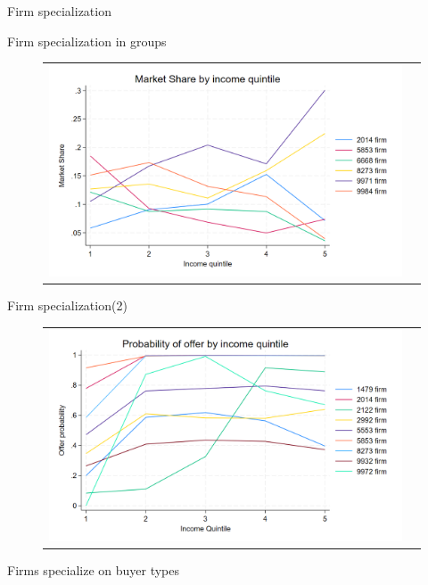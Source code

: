 \documentclass[10pt,aspectratio=169]{beamer}
\begin{document}


\begin{frame}{Firm specialization}\label{slide:fig1}    

Firm specialization in groups
\begin{figure}[H]
\centering{}%
\begin{tabular}{cc}
\includegraphics[scale=0.27]{../figures/IE3_supply_income_quintile.png}
\end{tabular}
\end{figure}

\hyperlink{slide:answer1}{}

\end{frame}


\begin{frame}{Firm specialization(2)}\label{slide:fig2}    

\begin{figure}[H]
\caption{}
\centering{}%
\begin{tabular}{cc}
\includegraphics[scale=0.24]{../figures/IE3_supply_offerprob_income_q(2).png}
\end{tabular}
\end{figure}

Firms specialize on buyer types
\hyperlink{slide:answer1}{}

\end{frame}
\end{document}
